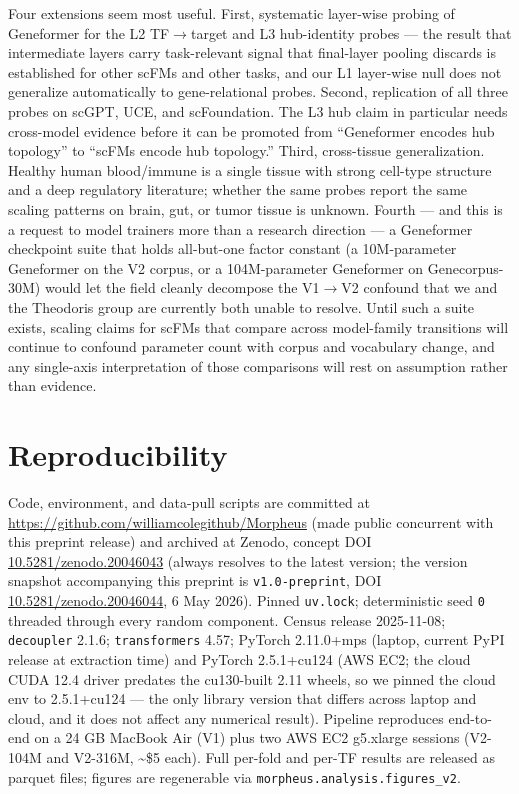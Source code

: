 \documentclass[
  11pt,
]{article}
\begin{document}
Four extensions seem most useful. First, systematic layer-wise probing
of Geneformer for the L2 TF$\to$target and L3 hub-identity probes --- the
\citet{civale2026} result that intermediate layers carry task-relevant
signal that final-layer pooling discards is established for other scFMs
and other tasks, and our L1 layer-wise null does not generalize
automatically to gene-relational probes. Second, replication of all
three probes on scGPT, UCE, and scFoundation. The L3 hub claim in
particular needs cross-model evidence before it can be promoted from
``Geneformer encodes hub topology'' to ``scFMs encode hub topology.''
Third, cross-tissue generalization. Healthy human blood/immune is a
single tissue with strong cell-type structure and a deep regulatory
literature; whether the same probes report the same scaling patterns on
brain, gut, or tumor tissue is unknown. Fourth --- and this is a request
to model trainers more than a research direction --- a Geneformer
checkpoint suite that holds all-but-one factor constant (a 10M-parameter
Geneformer on the V2 corpus, or a 104M-parameter Geneformer on
Genecorpus-30M) would let the field cleanly decompose the V1$\to$V2 confound
that we and the Theodoris group are currently both unable to resolve.
Until such a suite exists, scaling claims for scFMs that compare across
model-family transitions will continue to confound parameter count with
corpus and vocabulary change, and any single-axis interpretation of
those comparisons will rest on assumption rather than evidence.

\section{Reproducibility}\label{reproducibility}

Code, environment, and data-pull scripts are committed at
\url{https://github.com/williamcolegithub/Morpheus} (made public concurrent with this preprint release) and archived at Zenodo, concept DOI \href{https://doi.org/10.5281/zenodo.20046043}{10.5281/zenodo.20046043} (always resolves to the latest version; the version snapshot accompanying this preprint is \texttt{v1.0-preprint}, DOI \href{https://doi.org/10.5281/zenodo.20046044}{10.5281/zenodo.20046044}, 6 May 2026). Pinned \texttt{uv.lock};
deterministic seed \texttt{0} threaded through every random component.
Census release 2025-11-08; \texttt{decoupler} 2.1.6;
\texttt{transformers} 4.57; PyTorch 2.11.0+mps (laptop, current PyPI
release at extraction time) and PyTorch 2.5.1+cu124 (AWS EC2; the cloud
CUDA 12.4 driver predates the cu130-built 2.11 wheels, so we pinned the
cloud env to 2.5.1+cu124 — the only library version that differs across
laptop and cloud, and it does not affect any numerical result). Pipeline reproduces end-to-end on a 24 GB MacBook Air (V1)
plus two AWS EC2 g5.xlarge sessions (V2-104M and V2-316M,
\textasciitilde\$5 each). Full per-fold and per-TF results are released
as parquet files; figures are regenerable via
\texttt{morpheus.analysis.figures\_v2}.
\end{document}
